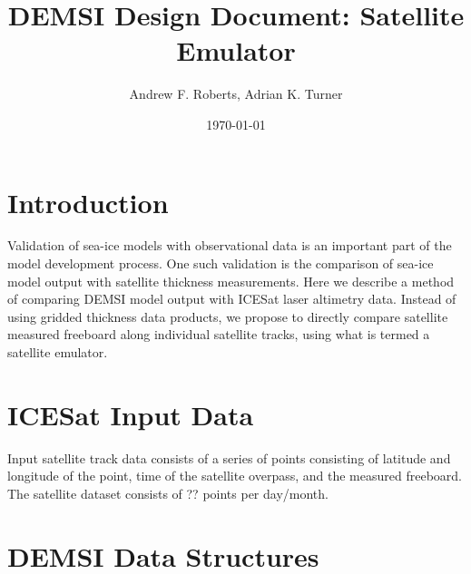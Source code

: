 \documentclass{article}
\title{DEMSI Design Document: Satellite Emulator}
\author{Andrew F. Roberts, Adrian K. Turner}
\date{\today}
\begin{document}
\maketitle

\section{Introduction}

Validation of sea-ice models with observational data is an important part of the model development process. One such validation is the comparison of sea-ice model output with satellite thickness measurements. Here we describe a method of comparing DEMSI model output with ICESat laser altimetry data. Instead of using gridded thickness data products, we propose to directly compare satellite measured freeboard along individual satellite tracks, using what is termed a satellite emulator.

\section{ICESat Input Data}

Input satellite track data consists of a series of points consisting of latitude and longitude of the point, time of the satellite overpass, and the measured freeboard. The satellite dataset consists of ?? points per day/month.

\section{DEMSI Data Structures}
\end{document}
